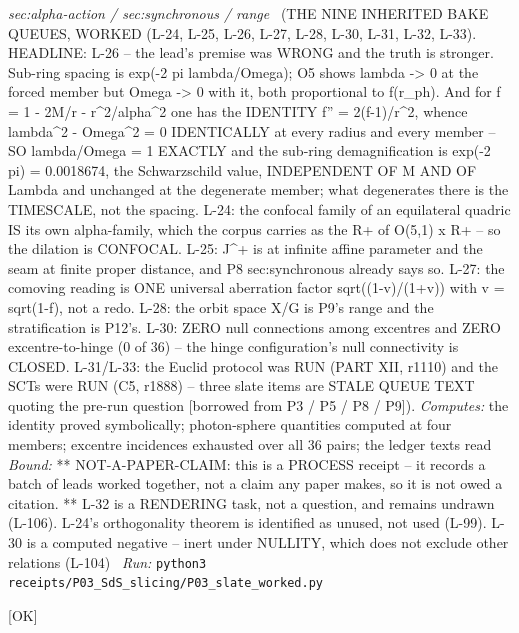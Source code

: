 \begin{description}
\textit{sec:alpha-action / sec:synchronous / range} \ (THE NINE INHERITED BAKE QUEUES, WORKED (L-24, L-25, L-26, L-27, L-28, L-30, L-31, L-32, L-33). HEADLINE: L-26 -- the lead's premise was WRONG and the truth is stronger. Sub-ring spacing is exp(-2 pi lambda/Omega); O5 shows lambda -> 0 at the forced member but Omega -> 0 with it, both proportional to f(r\_ph). And for f = 1 - 2M/r - r\textasciicircum{}2/alpha\textasciicircum{}2 one has the IDENTITY f'' = 2(f-1)/r\textasciicircum{}2, whence lambda\textasciicircum{}2 - Omega\textasciicircum{}2 = 0 IDENTICALLY at every radius and every member -- SO lambda/Omega = 1 EXACTLY and the sub-ring demagnification is exp(-2 pi) = 0.0018674, the Schwarzschild value, INDEPENDENT OF M AND OF Lambda and unchanged at the degenerate member; what degenerates there is the TIMESCALE, not the spacing. L-24: the confocal family of an equilateral quadric IS its own alpha-family, which the corpus carries as the R+ of O(5,1) x R+ -- so the dilation is CONFOCAL. L-25: J\textasciicircum{}+ is at infinite affine parameter and the seam at finite proper distance, and P8 sec:synchronous already says so. L-27: the comoving reading is ONE universal aberration factor sqrt((1-v)/(1+v)) with v = sqrt(1-f), not a redo. L-28: the orbit space X/G is P9's range and the stratification is P12's. L-30: ZERO null connections among excentres and ZERO excentre-to-hinge (0 of 36) -- the hinge configuration's null connectivity is CLOSED. L-31/L-33: the Euclid protocol was RUN (PART XII, r1110) and the SCTs were RUN (C5, r1888) -- three slate items are STALE QUEUE TEXT quoting the pre-run question [borrowed from P3 / P5 / P8 / P9]). 
\emph{Computes:} the identity proved symbolically; photon-sphere quantities computed at four members; excentre incidences exhausted over all 36 pairs; the ledger texts read
 \emph{Bound:} ** NOT-A-PAPER-CLAIM: this is a PROCESS receipt -- it records a batch of leads worked together, not a claim any paper makes, so it is not owed a citation. ** L-32 is a RENDERING task, not a question, and remains undrawn (L-106). L-24's orthogonality theorem is identified as unused, not used (L-99). L-30 is a computed negative -- inert under NULLITY, which does not exclude other relations (L-104)
\ \emph{Run:} \texttt{python3 receipts/P03\_SdS\_slicing/P03\_slate\_worked.py}
\item[\rcptlabel{P03_the_adjoint_is_entailed}{P3R44}\textbf{P3R44}\quad\texttt{P03\_the\_adjoint\_is\_entailed}]\hfill\textsf{[OK]}\\

\end{description}
